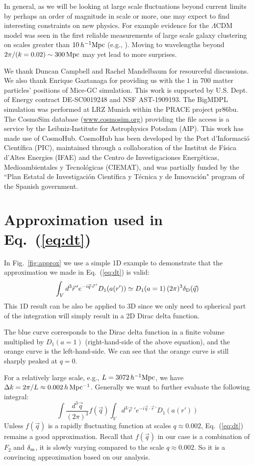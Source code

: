 \documentclass[prd,amsmath,amssymb,floatfix,superscriptaddress,nofootinbib,twocolumn]{revtex4-1}
\def\be{\begin{equation}}
\def\ee{\end{equation}}
\newcommand{\vrr}{\vec{r}}
\newcommand{\ec}[1]{Eq.~(\ref{eq:#1})}
\newcommand{\rf}[1]{\ref{fig:#1}}
\begin{document}
In general, as we will be looking at large scale fluctuations beyond current limits by perhaps an order of magnitude in scale or more, one may expect to find interesting constraints on new physics. For example evidence for the $\Lambda$CDM model was seen in the first reliable measurements of large scale galaxy clustering on scales greater than $10\,h^{-1}\rm Mpc$ (e.g., \cite{Efstathio:1990cdm}). Moving to wavelengths beyond $2\pi/(k=0.02) \sim 300 \rm \, Mpc$ may yet lead to more surprises.

\acknowledgements
We thank Duncan Campbell and Rachel Mandelbaum for resourceful discussions. We also thank Enrique Gaztanaga for providing us with the $1$ in $700$ matter particles' positions of Mice-GC simulation. This work is supported by U.S. Dept. of Energy contract DE-SC0019248 and NSF AST-1909193.
The BigMDPL simulation was performed at LRZ Munich within the PRACE project pr86bu. The CosmoSim database (\url{www.cosmosim.org}) providing the file access is a service by the Leibniz-Institute for Astrophysics Potsdam (AIP).
This work has made use of CosmoHub. CosmoHub has been developed by the Port d'Informació Científica (PIC), maintained through a collaboration of the Institut de Física d'Altes Energies (IFAE) and the Centro de Investigaciones Energéticas, Medioambientales y Tecnológicas (CIEMAT), and was partially funded by the ``Plan Estatal de Investigación Científica y Técnica y de Innovación" program of the Spanish government.
\clearpage

\appendix 

\section{Approximation used in \ec{dt}}\label{appenda}
In Fig.~\rf{approx} we use a simple 1D example to demonstrate that the approximation we made in \ec{dt} is valid:
\be 
\int_{V} d^{3}\vrr\, 'e^{-i\vec{q}\cdot \vrr\, '}{D_{1}(a(r'))}  \simeq D_{1}(a=1)\,(2\pi)^3\delta_{\rm D}(\vec{q})
\ee 
This 1D result can be also be applied to 3D since we only need to spherical part of the integration will simply result in a 2D Dirac delta function.

The blue curve corresponds to the Dirac delta function in a finite volume multiplied by $D_{1}(a=1)$ (right-hand-side of the above equation), and the orange curve is the left-hand-side. We can see that the orange curve is still sharply peaked at $q=0$. 

For a relatively large scale, e.g., $L=3072\, h^{-1}\rm Mpc$, we have $\Delta k=2\pi/L\approx 0.002 \, h \, \rm Mpc^{-1}$. Generally we want to further evaluate the following integral:
\be
\int \frac{d^{3}\vec{q}}{(2\pi)^3}f(\vec{q}) \int_{V} d^{3}\vrr\, 'e^{-i\vec{q}\cdot \vrr\, '}{D_{1}(a(r'))}
\ee 
Unless $f(\vec{q})$ is a rapidly fluctuating function at scales $q \approx 0.002$, \ec{dt} remains a good approximation. Recall that $f(\vec{q})$ in our case is a combination of $F_{2}$ and $\delta_{\rm m}$, it is slowly varying compared to the scale $q \approx 0.002$. So it is a convincing approximation based on our analysis.
\end{document}
